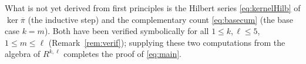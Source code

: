\documentclass{amsart}
\theoremstyle{definition}
\newcommand{\rkl}{R^{k,\ell}}
\begin{document}
What is not yet derived from first principles is the
Hilbert series \eqref{eq:kernelHilb} of $\ker\overline\pi$ (the inductive step) and
the complementary count \eqref{eq:basecum} (the base case $k=m$). Both have been
verified symbolically for all $1\le k,\ell\le5$, $1\le m\le\ell$
(Remark~\ref{rem:verif}); supplying these two computations from the algebra of
$\rkl$ completes the proof of \eqref{eq:main}.
\end{document}
